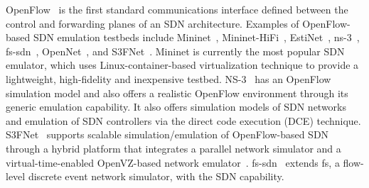 OpenFlow~\cite{Openflow} is the first standard communications interface defined between the control and forwarding planes of an SDN architecture. 
Examples of OpenFlow-based SDN emulation testbeds include Mininet~\cite{LaptopSDN},
Mininet-HiFi~\cite{ReproNetExprCBE}, EstiNet~\cite{EstiNet}, ns-3~\cite{NS-3}, fs-sdn~\cite{FSSDN}, OpenNet~\cite{OpenNet}, and S3FNet~\cite{jin2013parallel}.
Mininet is currently the most popular SDN emulator, which uses Linux-container-based virtualization technique to provide a lightweight, high-fidelity and inexpensive testbed.
NS-3~\cite{NS-3} has an OpenFlow simulation model and also offers a realistic OpenFlow environment through its generic emulation capability.
It also offers simulation models of SDN networks and emulation of SDN controllers via the direct code execution (DCE) technique.
S3FNet~\cite{jin2013parallel} supports scalable simulation/emulation of OpenFlow-based SDN through
a hybrid platform that integrates a parallel network simulator and a virtual-time-enabled OpenVZ-based network emulator~\cite{S3FWebsite}.
fs-sdn~\cite{FSSDN} extends fs, a flow-level discrete event network simulator, with the SDN capability.
